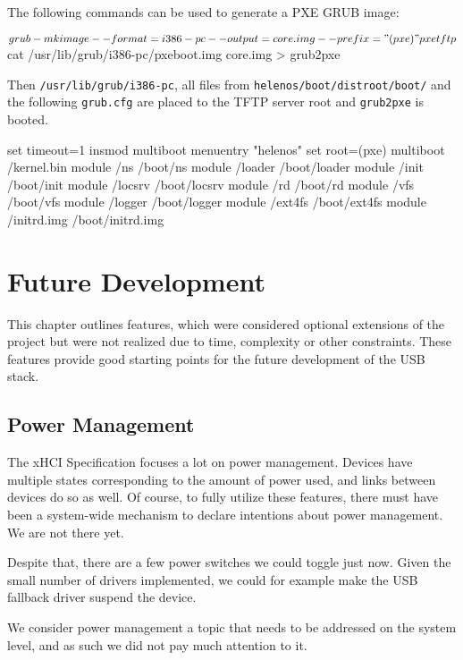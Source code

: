 The following commands can be used to generate a PXE GRUB image:

\begin{bdsh}
$ grub-mkimage --format=i386-pc --output=core.img --prefix="(pxe)" pxe tftp
$ cat /usr/lib/grub/i386-pc/pxeboot.img core.img > grub2pxe
\end{bdsh}

Then \texttt{/usr/lib/grub/i386-pc}, all files from
\texttt{helenos/boot/distroot/boot/} and the following \texttt{grub.cfg} are
placed to the TFTP server root and \texttt{grub2pxe} is booted.

\begin{bdsh}
set timeout=1
insmod multiboot
menuentry "helenos" {
  set root=(pxe)
  multiboot /kernel.bin
  module    /ns /boot/ns
  module    /loader /boot/loader
  module    /init /boot/init
  module    /locsrv /boot/locsrv
  module    /rd /boot/rd
  module    /vfs /boot/vfs
  module    /logger /boot/logger
  module    /ext4fs /boot/ext4fs
  module    /initrd.img /boot/initrd.img
}
\end{bdsh}

\section{Future Development}

This chapter outlines features, which were considered optional extensions of
the project but were not realized due to time, complexity or other constraints.
These features provide good starting points for the future development of the
USB stack.

\subsection{Power Management}

The xHCI Specification focuses a lot on power management. Devices have multiple
states corresponding to the amount of power used, and links between devices
do so as well. Of course, to fully utilize these features, there must have been
a system-wide mechanism to declare intentions about power management. We are not
there yet.

Despite that, there are a few power switches we could toggle just now. Given the
small number of drivers implemented, we could for example make the USB fallback
driver suspend the device.

We consider power management a topic that needs to be addressed on the
system level, and as such we did not pay much attention to it.

